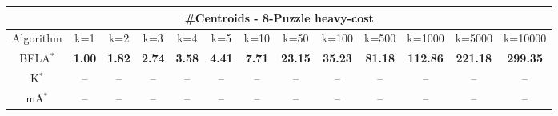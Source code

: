 \begin{tabular}{c|cccccccccccc}\toprule
\multicolumn{13}{c}{#Centroids - 8-Puzzle heavy-cost}\\ \midrule
Algorithm & k=1 & k=2 & k=3 & k=4 & k=5 & k=10 & k=50 & k=100 & k=500 & k=1000 & k=5000 & k=10000 \\ \midrule
BELA$^*$ & \textbf{1.00} & \textbf{1.82} & \textbf{2.74} & \textbf{3.58} & \textbf{4.41} & \textbf{7.71} & \textbf{23.15} & \textbf{35.23} & \textbf{81.18} & \textbf{112.86} & \textbf{221.18} & \textbf{299.35} \\
K$^*$ & -- & -- & -- & -- & -- & -- & -- & -- & -- & -- & -- & -- \\
mA$^*$ & -- & -- & -- & -- & -- & -- & -- & -- & -- & -- & -- & -- \\ \bottomrule 
\end{tabular}
